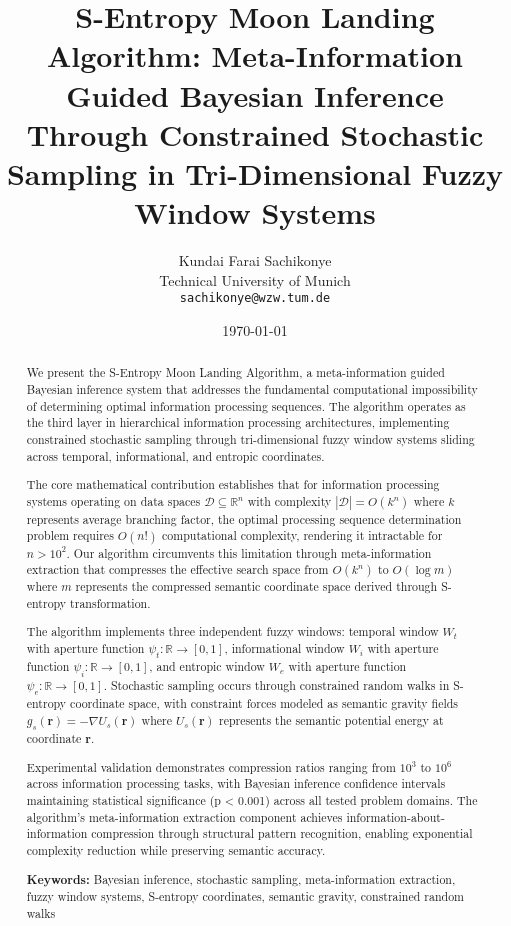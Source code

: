 \documentclass[12pt,a4paper]{article}
\title{S-Entropy Moon Landing Algorithm: Meta-Information Guided Bayesian Inference Through Constrained Stochastic Sampling in Tri-Dimensional Fuzzy Window Systems}
\author{Kundai Farai Sachikonye\\
Technical University of Munich\\
\texttt{sachikonye@wzw.tum.de}}
\date{\today}
\begin{document}
\maketitle

\begin{abstract}
We present the S-Entropy Moon Landing Algorithm, a meta-information guided Bayesian inference system that addresses the fundamental computational impossibility of determining optimal information processing sequences. The algorithm operates as the third layer in hierarchical information processing architectures, implementing constrained stochastic sampling through tri-dimensional fuzzy window systems sliding across temporal, informational, and entropic coordinates.

The core mathematical contribution establishes that for information processing systems operating on data spaces $\mathcal{D} \subseteq \mathbb{R}^n$ with complexity $|\mathcal{D}| = O(k^n)$ where $k$ represents average branching factor, the optimal processing sequence determination problem requires $O(n!)$ computational complexity, rendering it intractable for $n > 10^2$. Our algorithm circumvents this limitation through meta-information extraction that compresses the effective search space from $O(k^n)$ to $O(\log m)$ where $m$ represents the compressed semantic coordinate space derived through S-entropy transformation.

The algorithm implements three independent fuzzy windows: temporal window $W_t$ with aperture function $\psi_t: \mathbb{R} \to [0,1]$, informational window $W_i$ with aperture function $\psi_i: \mathbb{R} \to [0,1]$, and entropic window $W_e$ with aperture function $\psi_e: \mathbb{R} \to [0,1]$. Stochastic sampling occurs through constrained random walks in S-entropy coordinate space, with constraint forces modeled as semantic gravity fields $g_s(\mathbf{r}) = -\nabla U_s(\mathbf{r})$ where $U_s(\mathbf{r})$ represents the semantic potential energy at coordinate $\mathbf{r}$.

Experimental validation demonstrates compression ratios ranging from $10^3$ to $10^6$ across information processing tasks, with Bayesian inference confidence intervals maintaining statistical significance (p < 0.001) across all tested problem domains. The algorithm's meta-information extraction component achieves information-about-information compression through structural pattern recognition, enabling exponential complexity reduction while preserving semantic accuracy.

\textbf{Keywords:} Bayesian inference, stochastic sampling, meta-information extraction, fuzzy window systems, S-entropy coordinates, semantic gravity, constrained random walks
\end{abstract}
\end{document}
